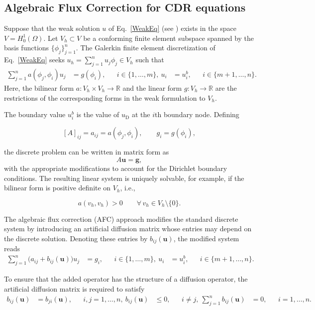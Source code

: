 \documentclass[a4paper]{article}
\theoremstyle{plain}
\theoremstyle{definition}
\theoremstyle{remark}
\begin{document}
\subsection{Algebraic Flux Correction for CDR equations}
Suppose that the weak solution $u$ of Eq.~\eqref{WeakEq} (see \cite[Sec.~2.2.1]{RST08}) exists in the space $V=H_0^1(\Omega).$ Let $V_h\subset V$ be a conforming finite element subspace spanned by the basis functions $\{\phi_j\}_{j=1}^n$. The Galerkin finite element discretization of Eq.~\eqref{WeakEq} seeks $u_h=\sum_{j=1}^n u_j\phi_j\in V_h$ such that
\begin{align}
\sum_{j=1}^{n}a(\phi_j,\phi_i)u_j &= g(\phi_i),
&& i\in\{1,\ldots,m\},\
u_i &= u_i^b,
&& i\in\{m+1,\ldots,n\}.
\end{align}
Here, the bilinear form $a:V_h\times V_h\to\mathbb{R}$ and the linear form $g:V_h\to\mathbb{R}$ are the restrictions of the corresponding forms in the weak formulation to $V_h$.

The boundary value $u_i^b$ is the value of $u_{\mathrm D}$ at the $i$th boundary node. Defining

$$
[A]_{ij}=a_{ij}=a(\phi_j,\phi_i),
\qquad
g_i=g(\phi_i),
$$

the discrete problem can be written in matrix form as
\begin{equation}
A\mathbf u=\mathbf g,
\label{eq:Lin_Sys}
\end{equation}
with the appropriate modifications to account for the Dirichlet boundary conditions. The resulting linear system is uniquely solvable, for example, if the bilinear form is positive definite on $V_h$, i.e.,

$$
a(v_h,v_h)>0 \qquad\forall\,v_h\in V_h\setminus\{0\}.
$$

The algebraic flux correction (AFC) approach modifies the standard discrete system by introducing an artificial diffusion matrix whose entries may depend on the discrete solution. Denoting these entries by $b_{ij}(\mathbf u)$, the modified system reads
\begin{align}
\sum_{j=1}^{n}\bigl(a_{ij}+b_{ij}(\mathbf u)\bigr)u_j
&=g_i,
&& i\in\{1,\ldots,m\},\label{eq:AFC_Sys}\
u_i&=u_i^b,
&& i\in\{m+1,\ldots,n\}.
\end{align}

To ensure that the added operator has the structure of a diffusion operator, the artificial diffusion matrix is required to satisfy
\begin{align*}
b_{ij}(\mathbf u)&=b_{ji}(\mathbf u),
&& i,j=1,\ldots,n,\
b_{ij}(\mathbf u)&\leq0,
&& i\neq j,\
\sum_{j=1}^{n}b_{ij}(\mathbf u)&=0,
&& i=1,\ldots,n.
\end{align*}
\end{document}
